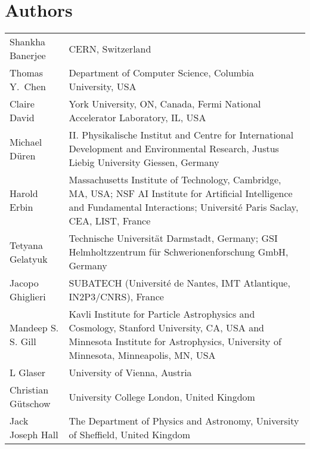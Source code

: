 \documentclass[../SustainableHEP.tex]{subfiles}
\begin{document}
\newpage


\section*{Authors}
{}
\renewcommand{\arraystretch}{1.5}
\noindent\begin{longtable*}{@{}m{0.3\textwidth} p{0.7\textwidth}}
Shankha Banerjee & CERN, Switzerland\\ %

Thomas Y.\ Chen & Department of Computer Science, Columbia University, USA\\

Claire David & York University, ON, Canada, Fermi National Accelerator Laboratory, IL, USA\\

Michael Düren & II. Physikalische Institut and  Centre for International Development and Environmental Research, Justus Liebig University Giessen, Germany\\ %

Harold Erbin & Massachusetts Institute of Technology, Cambridge, MA, USA; NSF AI Institute for Artificial Intelligence and Fundamental Interactions; Université Paris Saclay, CEA, LIST, France\\ %

Tetyana Gelatyuk & Technische Universität Darmstadt,  Germany; GSI Helmholtzzentrum für Schwerionenforschung GmbH, Germany\\ %

Jacopo Ghiglieri & SUBATECH (Universit\'e de Nantes, IMT Atlantique, IN2P3/CNRS), France\\ %

Mandeep S. S. Gill & Kavli Institute for Particle Astrophysics and Cosmology, Stanford University, CA, USA  and Minnesota Institute for Astrophysics, University of Minnesota, Minneapolis, MN,  USA \\ %

L Glaser & University of Vienna, Austria \\ %

Christian G\"utschow & University College London, United Kingdom\\

Jack Joseph Hall & The Department of Physics and Astronomy, University of Sheffield, United Kingdom\\


\end{longtable*}
\end{document}
